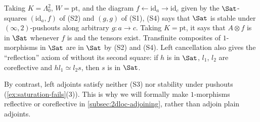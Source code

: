 Taking $K = \Lambda^{2}_{0}$, $W = \mathrm{pt}$, and the diagram $f \leftarrow \mathrm{id}_{a} \rightarrow \mathrm{id}_{c}$ given by the $\Sat$-squares $(\mathrm{id}_{a},f)$ of (S2) and $(g,g)$ of (S1), (S4) says that $\Sat$ is stable under $(\infty,2)$-pushouts along arbitrary $g\colon a \to c$. Taking $K = \mathrm{pt}$, it says that $A \otimes f$ is in $\Sat$ whenever $f$ is and the tensors exist. Transfinite composites of $1$-morphisms in $\Sat$ are in $\Sat$ by (S2) and (S4).
Left cancellation also gives the ``reflection'' axiom of \cite[Prop.~1.17(4)]{dilibertilobbiasousa2022kz} without its second square: if $h$ is in $\Sat$, $l_{1}$, $l_{2}$ are coreflective and $hl_{1} \simeq l_{2}s$, then $s$ is in $\Sat$.

By contrast, left adjoints satisfy neither (S3) nor stability under pushouts (\cref{ex:saturation-fails}(3)). This is why we will formally make $1$-morphisms reflective or coreflective in \cref{subsec:2dloc-adjoining}, rather than adjoin plain adjoints.
